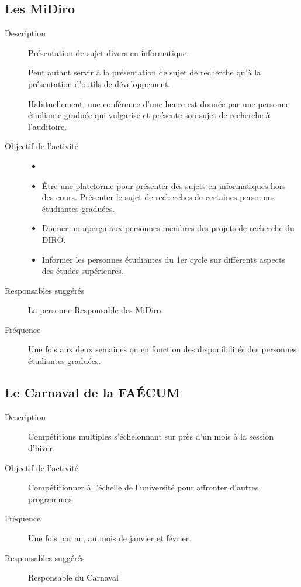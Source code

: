 \documentclass{aediroum}
\begin{document}
\subsection{Les MiDiro}\label{sec:midiros}
\begin{description}
	\item[Description] Présentation de sujet divers en informatique.

	Peut autant servir à la présentation de sujet de recherche qu'à la présentation d'outils de développement.

	Habituellement, une conférence d'une heure est donnée par une personne étudiante graduée qui vulgarise et présente son sujet de recherche à l’auditoire.
	\item[Objectif de l'activité]
	\begin{itemize}
		\item[]
		\item Être une plateforme pour présenter des sujets en informatiques hors des cours. Présenter le sujet de recherches de certaines personnes étudiantes graduées.
		\item Donner un aperçu aux personnes membres des projets de recherche du DIRO.
		\item Informer les personnes étudiantes du 1er cycle sur différents aspects des études supérieures.
	\end{itemize}
	\item[Responsables suggérés] La personne Responsable des MiDiro.
 	\item[Fréquence] Une fois aux deux semaines ou en fonction des disponibilités des personnes étudiantes graduées.
\end{description}

\subsection{Le Carnaval de la FAÉCUM}\label{sec:carnaval}
\begin{description}
	\item[Description] Compétitions multiples s'échelonnant sur près d'un mois à la session d'hiver.
	\item[Objectif de l'activité] Compétitionner à l'échelle de l'université pour affronter d'autres programmes
	\item[Fréquence] Une fois par an, au mois de janvier et février.
	\item[Responsables suggérés] Responsable du Carnaval
\end{description}
\end{document}
